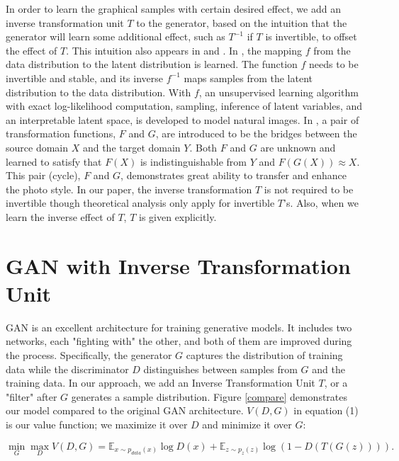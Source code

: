 \documentclass{article}
\begin{document}
In order to learn the graphical samples with certain desired effect, we add an inverse transformation unit $T$ to the generator, based on the intuition that the generator will learn some additional effect, such as $T^{-1}$ if $T$ is invertible, to offset the effect of $T$. This intuition also appears in \cite{realNVP} and \cite{cycleGAN}.
In \cite{realNVP}, the mapping $f$ from the data distribution to the latent distribution is learned. The function $f$ needs to be invertible and stable, and its inverse $f^{-1}$ maps samples from the latent distribution to the data distribution. With $f$, an unsupervised learning algorithm with exact log-likelihood computation, sampling, inference of latent variables, and an interpretable latent space, is developed to model natural images.
In \cite{cycleGAN}, a pair of transformation functions, $F$ and $G$, are introduced to be the bridges between the source domain $X$ and the target domain $Y$. Both $F$ and $G$ are unknown and learned to satisfy that $F(X)$ is indistinguishable from $Y$ and $F(G(X))\approx X$. This pair (cycle), $F$ and $G$, demonstrates great ability to transfer and enhance the photo style.
In our paper, the inverse transformation $T$ is not required to be invertible though theoretical analysis only apply for invertible $T$'s. Also, when we learn the inverse effect of $T$, $T$ is given explicitly.




\section{GAN with Inverse Transformation Unit}
GAN \cite{GAN} is an excellent architecture for training generative models. It includes two networks, each "fighting with" the other, and both of them are improved during the process. Specifically, the generator $G$
captures the distribution of training data while the discriminator $D$ distinguishes between samples from $G$ and the training data. In our approach, we add an Inverse Transformation Unit $T$, or a "filter" after $G$ generates a sample distribution. Figure \ref{compare} demonstrates our model compared to the original GAN \cite{GAN} architecture. $V(D,G)$ in equation (1) is our value function; we maximize it over $D$ and minimize it over $G$:



\begin{equation}\min_G\max_D V(D,G)=\mathbb{E}_{x\sim p_{data}(x)}\log D(x)+\mathbb{E}_{z\sim p_z(z)}\log\left(1-D(T(G(z)))\right).\end{equation}
\end{document}
